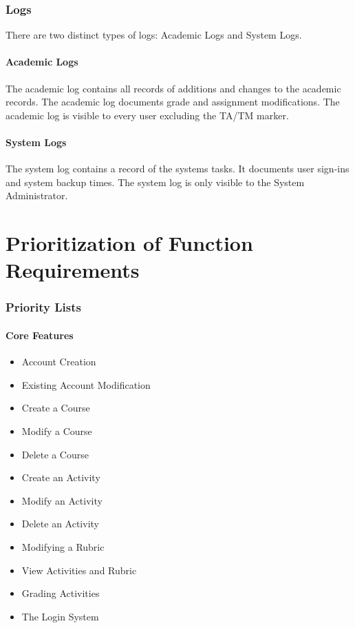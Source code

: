\documentclass{article}
\begin{document}
\section{Logs}
There are two distinct types of logs: Academic Logs and System Logs.
\subsection{Academic Logs}
The academic log contains all records of additions and changes to the academic records.
The academic log documents grade and assignment modifications.  The academic log
is visible to every user excluding the TA/TM marker.
\subsection{System Logs}
The system log contains a record of the systems tasks.  It documents user sign-ins
and system backup times. The system log is only visible to the System Administrator.

\part{Prioritization of Function Requirements}
\section{Priority Lists}
\subsection{Core Features}
\begin{itemize}
  \item Account Creation
  \item Existing Account Modification
  \item Create a Course
  \item Modify a Course
  \item Delete a Course
  \item Create an Activity
  \item Modify an Activity
  \item Delete an Activity
  \item Modifying a Rubric
  \item View Activities and Rubric
  \item Grading Activities
  \item The Login System
\end{itemize}
\end{document}
